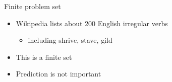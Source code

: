 \documentclass[10pt, compress]{beamer}
\begin{document}
\begin{frame}{Finite problem set}
	\begin{itemize}
		\item Wikipedia lists about 200 English irregular verbs
		\begin{itemize}
			\item including \alert{shrive}, \alert{stave}, \alert{gild}
		\end{itemize}
		\item This is a finite set%
		\item Prediction is not important
	\end{itemize}
\end{frame}


\end{document}
